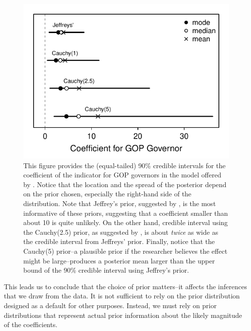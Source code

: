\documentclass[12pt]{article}
\begin{document}
\begin{figure}[H]
\begin{center}
\includegraphics[scale = .8]{figs/matters-ci.pdf}
\caption{This figure provides the (equal-tailed) 90\% credible intervals for the coefficient of the indicator for GOP governors in the model offered by \cite{BarrilleauxRainey2014}. Notice that the location and the spread of the posterior depend on the prior chosen, especially the right-hand side of the distribution. Note that Jeffrey's prior, suggested by \cite{Zorn2005}, is the most informative of these priors, suggesting that a coefficient smaller than about 10 is quite unlikely. On the other hand, credible interval using the Cauchy(2.5) prior, as suggested by \cite{Gelmanetal2008}, is about \emph{twice} as wide as the credible interval from Jeffreys' prior. Finally, notice that the Cauchy(5) prior--a plausible prior if the researcher believes the effect might be large--produces a posterior mean larger than the upper bound of the 90\% credible interval using Jeffrey's prior.}\label{fig:matters-ci}
\end{center}
\end{figure}

This leads us to conclude that the choice of prior matters--it affects the inferences that we draw from the data. It is not sufficient to rely on the prior distribution designed as a default for other purposes. Instead, we must rely on prior distributions that represent actual prior information about the likely magnitude of the coefficients.

\clearpage


\end{document}
